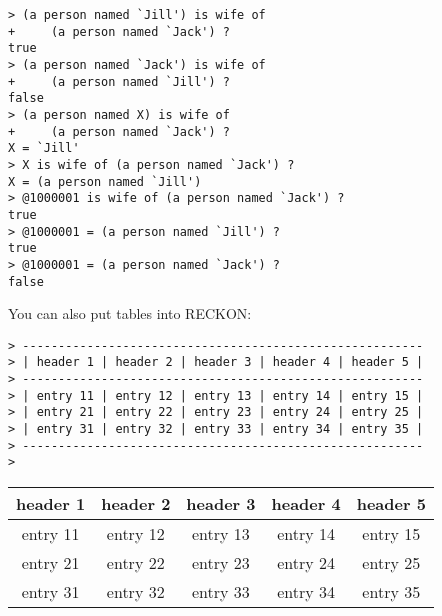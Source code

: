 \documentclass[12pt]{article}
\newenvironment{indpar}[1][0.3in]%
	{\begin{list}{}%
		     {\setlength{\itemsep}{0in}%
		      \setlength{\topsep}{0in}%
		      \setlength{\parsep}{1ex}%
		      \setlength{\labelwidth}{#1}%
		      \setlength{\leftmargin}{#1}%
		      \addtolength{\leftmargin}{\labelsep}}%
	 \item}%
	{\end{list}}
\begin{document}
\begin{indpar}
\verb|> (a person named `Jill') is wife of| \\
\verb|+     (a person named `Jack') ?| \\
\verb|true| \\
\verb|> (a person named `Jack') is wife of| \\
\verb|+     (a person named `Jill') ?| \\
\verb|false| \\
\verb|> (a person named X) is wife of| \\
\verb|+     (a person named `Jack') ?| \\
\verb|X = `Jill'| \\
\verb|> X is wife of (a person named `Jack') ?| \\
\verb|X = (a person named `Jill')| \\
\verb|> @1000001 is wife of (a person named `Jack') ?| \\
\verb|true| \\
\verb|> @1000001 = (a person named `Jill') ?| \\
\verb|true| \\
\verb|> @1000001 = (a person named `Jack') ?| \\
\verb|false|
\end{indpar}

You can also put tables into RECKON:

\begin{indpar}\begin{verbatim}
> --------------------------------------------------------
> | header 1 | header 2 | header 3 | header 4 | header 5 |
> --------------------------------------------------------
> | entry 11 | entry 12 | entry 13 | entry 14 | entry 15 |
> | entry 21 | entry 22 | entry 23 | entry 24 | entry 25 |
> | entry 31 | entry 32 | entry 33 | entry 34 | entry 35 |
> --------------------------------------------------------
>
\end{verbatim}\end{indpar}
\begin{center}
\begin{tabular}{|c|c|c|c|c|}
\hline
\bf header 1 & \bf header 2 & \bf header 3 & \bf header 4 & \bf header 5 \\
\hline
entry 11 & entry 12 & entry 13 & entry 14 & entry 15 \\
entry 21 & entry 22 & entry 23 & entry 24 & entry 25 \\
entry 31 & entry 32 & entry 33 & entry 34 & entry 35 \\
\hline
\end{tabular}
\end{center}
\end{document}
